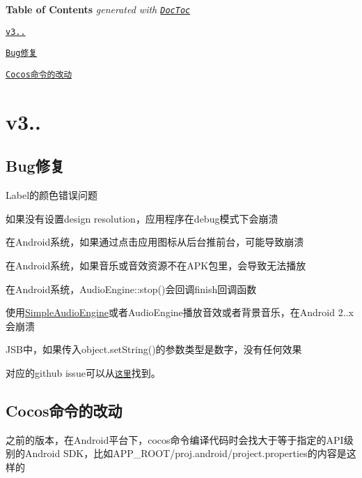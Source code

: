 {\bfseries Table of Contents} {\itshape generated with \href{https://github.com/thlorenz/doctoc}{\tt Doc\+Toc}}


\begin{DoxyItemize}
\item \href{#v3131}{\tt v3..}
\begin{DoxyItemize}
\item \href{#bug%E4%BF%AE%E5%A4%8D}{\tt Bug修复}
\item \href{#cocos%E5%91%BD%E4%BB%A4%E7%9A%84%E6%94%B9%E5%8A%A8}{\tt Cocos命令的改动}
\end{DoxyItemize}
\end{DoxyItemize}

\section*{v3..}

\subsection*{Bug修复}


\begin{DoxyItemize}
\item Label的颜色错误问题
\item 如果没有设置{\ttfamily design resolution}，应用程序在debug模式下会崩溃
\item 在\+Android系统，如果通过点击应用图标从后台推前台，可能导致崩溃
\item 在\+Android系统，如果音乐或音效资源不在\+A\+P\+K包里，会导致无法播放
\item 在\+Android系统，\+Audio\+Engine\+::stop()会回调{\ttfamily finish}回调函数
\item 使用{\ttfamily \hyperlink{interfaceSimpleAudioEngine}{Simple\+Audio\+Engine}}或者{\ttfamily Audio\+Engine}播放音效或者背景音乐，在\+Android 2..\+x会崩溃
\item J\+S\+B中，如果传入object.\+set\+String()的参数类型是数字，没有任何效果
\end{DoxyItemize}

对应的github issue可以从\href{https://github.com/cocos2d/cocos2d-x/milestone/33}{\tt 这里}找到。

\subsection*{Cocos命令的改动}

之前的版本，在\+Android平台下，cocos命令编译代码时会找大于等于指定的\+A\+P\+I级别的\+Android S\+D\+K，比如{\ttfamily A\+P\+P\+\_\+\+R\+O\+O\+T/proj.\+android/project.properties}的内容是这样的


